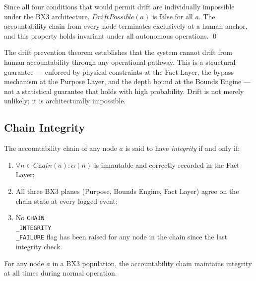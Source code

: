 \begin{Proof}
Since all four conditions that would permit drift are individually impossible under the BX3 architecture, $\textit{DriftPossible}(a)$ is false for all $a$. The accountability chain from every node terminates exclusively at a human anchor, and this property holds invariant under all autonomous operations. \qed
\end{Proof}

The drift prevention theorem establishes that the system cannot drift from human accountability through any operational pathway. This is a structural guarantee — enforced by physical constraints at the Fact Layer, the bypass mechanism at the Purpose Layer, and the depth bound at the Bounds Engine — not a statistical guarantee that holds with high probability. Drift is not merely unlikely; it is architecturally impossible.

\subsection{Chain Integrity}
\label{sec:chain-integrity}

\begin{definition}
\label{def:chain-integrity}
The accountability chain of any node $a$ is said to have \textit{integrity} if and only if:
\begin{enumerate}[noitemsep]
    \item $\forall n \in \textit{Chain}(a) : \alpha(n)$ is immutable and correctly recorded in the Fact Layer;
    \item All three BX3 planes (Purpose, Bounds Engine, Fact Layer) agree on the chain state at every logged event;
    \item No \texttt{CHAIN\\_INTEGRITY\\_FAILURE} flag has been raised for any node in the chain since the last integrity check.
\end{enumerate}
\end{definition}

\begin{corrolary}
For any node $a$ in a BX3 population, the accountability chain maintains integrity at all times during normal operation.
\end{corrolary}

